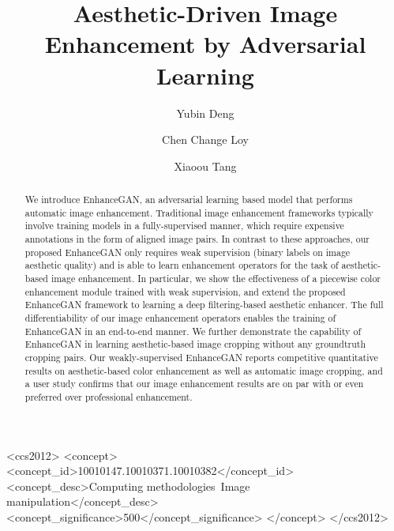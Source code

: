 \documentclass[sigconf]{acmart}
\begin{document}
\title{Aesthetic-Driven Image Enhancement by Adversarial Learning}






\author{Yubin Deng}
\author{Chen Change Loy}
\author{Xiaoou Tang}





\begin{abstract}
We introduce EnhanceGAN, an adversarial learning based model that performs automatic image enhancement. 
Traditional image enhancement frameworks typically involve training models in a fully-supervised manner, which require expensive annotations in the form of aligned image pairs.  
In contrast to these approaches, our proposed EnhanceGAN only requires weak supervision (binary labels on image aesthetic quality) and is able to learn enhancement operators for the task of aesthetic-based image enhancement. 
In particular, we show the effectiveness of a piecewise color enhancement module trained with weak supervision, and extend the proposed EnhanceGAN framework to learning a deep filtering-based aesthetic enhancer.
The full differentiability of our image enhancement operators enables the training of EnhanceGAN in an end-to-end manner. 
We further demonstrate the capability of EnhanceGAN in learning aesthetic-based image cropping without any groundtruth cropping pairs.
Our weakly-supervised EnhanceGAN reports competitive quantitative results on aesthetic-based color enhancement as well as automatic image cropping, and a user study confirms that our image enhancement results are on par with or even preferred over professional enhancement.
\end{abstract}

\begin{CCSXML}
<ccs2012>
<concept>
<concept_id>10010147.10010371.10010382</concept_id>
<concept_desc>Computing methodologies~Image manipulation</concept_desc>
<concept_significance>500</concept_significance>
</concept>
</ccs2012>
\end{CCSXML}

\maketitle
\end{document}
